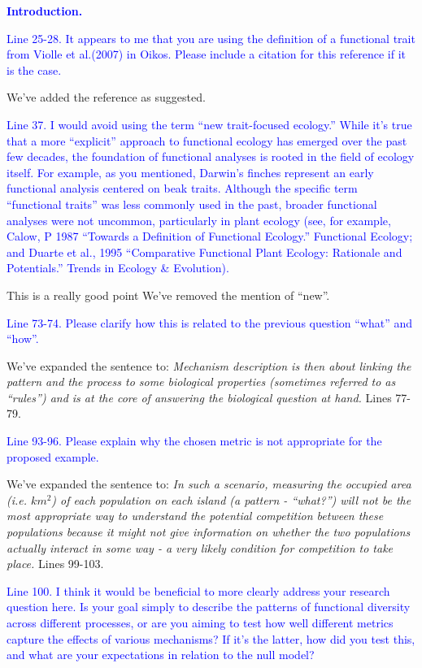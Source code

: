 \documentclass[
]{article}
\begin{document}
\textcolor{blue}{\textbf{Introduction.}}

\textcolor{blue}{Line 25-28. It appears to me that you are using the definition of a functional trait from Violle et al.(2007) in Oikos. Please include a citation for this reference if it is the case.}

We've added the reference as suggested.

\textcolor{blue}{Line 37. I would avoid using the term ``new trait-focused ecology.'' While it's true that a more ``explicit'' approach to functional ecology has emerged over the past few decades, the foundation of functional analyses is rooted in the field of ecology itself.
For example, as you mentioned, Darwin's finches represent an early functional analysis centered on beak traits.
Although the specific term ``functional traits'' was less commonly used in the past, broader functional analyses were not uncommon, particularly in plant ecology (see, for example, Calow, P 1987 ``Towards a Definition of Functional Ecology.'' Functional Ecology; and Duarte et al., 1995 ``Comparative Functional Plant Ecology: Rationale and Potentials.'' Trends in Ecology \& Evolution).}

This is a really good point
We've removed the mention of ``new''.

\textcolor{blue}{Line 73-74. Please clarify how this is related to the previous question ``what'' and ``how''.}

We've expanded the sentence to:
\textit{Mechanism description is then about linking the pattern and the process to some biological properties (sometimes referred to as ``rules'') and is at the core of answering the biological question at hand.}
Lines 77-79.

\textcolor{blue}{Line 93-96. Please explain why the chosen metric is not appropriate for the proposed example.}

We've expanded the sentence to:
\textit{In such a scenario, measuring the occupied area (i.e. $km^{2}$) of each population on each island (a pattern - ``what?'') will not be the most appropriate way to understand the potential competition between these populations because it might not give information on whether the two populations actually interact in some way - a very likely condition for competition to take place.}
Lines 99-103.

\textcolor{blue}{Line 100. I think it would be beneficial to more clearly address your research question here. Is your goal simply to describe the patterns of functional diversity across different processes, or are you aiming to test how well different metrics capture the effects of various mechanisms? If it's the latter, how did you test this, and what are your expectations in relation to the null model?}
\end{document}
